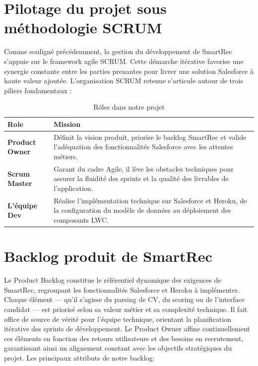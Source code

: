 \section {Pilotage du projet sous méthodologie SCRUM}
Comme souligné précédemment, la gestion du développement de SmartRec s'appuie sur le framework agile SCRUM. Cette démarche itérative favorise une synergie constante entre les parties prenantes pour livrer une solution Salesforce à haute valeur ajoutée. L'organisation SCRUM retenue s'articule autour de trois piliers fondamentaux :
\vspace{0.3cm}
\begin{table}[H]
\caption{Rôles dans notre projet}
\begin{tabular}{|m{3.5cm}|m{11cm}|}
\hline
\rowcolor{WhiteSmoke} \arrayrulecolor{black}

\hline
\hfil{\cellcolor{WhiteSmoke}\textbf{Role}}
&\hfil{\cellcolor{WhiteSmoke}\textbf{Mission}}\\
 
\hline
\textbf{Product Owner} & Définit la vision produit, priorise le backlog SmartRec et valide l'adéquation des fonctionnalités Salesforce avec les attentes métiers.\\
  \hline

\textbf{Scrum Master} &  Garant du cadre Agile, il lève les obstacles techniques pour assurer la fluidité des sprints et la qualité des livrables de l'application.\\
  \hline
 
\textbf{L’équipe Dev} &  Réalise l'implémentation technique sur Salesforce et Heroku, de la configuration du modèle de données au déploiement des composants LWC.\\
  \hline
\end{tabular}
\end{table}

\section{Backlog produit de SmartRec}

Le Product Backlog constitue le référentiel dynamique des exigences de SmartRec, regroupant les fonctionnalités Salesforce et Heroku à implémenter. Chaque élément — qu'il s'agisse du parsing de CV, du scoring ou de l'interface candidat — est priorisé selon sa valeur métier et sa complexité technique. 
\cite{ScrumOrgBacklog} 
\newline
Il fait office de source de vérité pour l'équipe technique, orientant la planification itérative des sprints de développement. Le Product Owner affine continuellement ces éléments en fonction des retours utilisateurs et des besoins en recrutement, garantissant ainsi un alignement constant avec les objectifs stratégiques du projet.
\cite{AtlassianBacklog} 
\newline
Les principaux attributs de notre backlog:


